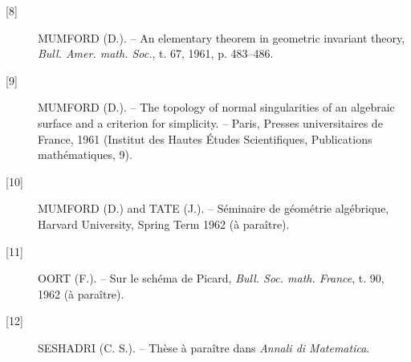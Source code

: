 \begin{description}
\item[{[8]}] MUMFORD (D.). -- An elementary theorem in geometric invariant
theory, \emph{Bull. Amer. math. Soc.}, t. 67, 1961, p. 483--486.

\item[{[9]}] MUMFORD (D.). -- The topology of normal singularities of an
algebraic surface and a criterion for simplicity. -- Paris, Presses
universitaires de France, 1961 (Institut des Hautes Études Scientifiques,
Publications mathématiques, 9).

\item[{[10]}] MUMFORD (D.) and TATE (J.). -- Séminaire de géométrie
algébrique, Harvard University, Spring Term 1962 (à paraître).

\item[{[11]}] OORT (F.). -- Sur le schéma de Picard,
\emph{Bull. Soc. math. France}, t. 90, 1962 (à paraître).

\item[{[12]}] SESHADRI (C. S.). -- Thèse à paraître dans
\emph{Annali di Matematica}.
\end{description}

\par\smallskip
\begingroup\footnotesize
\endgroup
